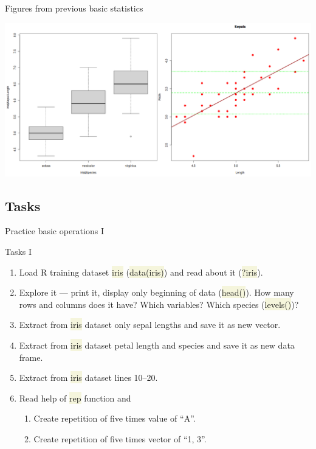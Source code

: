 \documentclass[compress, ucs, xelatex, 11pt, xcolor=svgnames, aspectratio=169,
	hyperref={
		bookmarks=true,
		unicode=true,
		colorlinks=true,
		pdftitle={Molecular data in R},
		plainpages=false,
		pdfauthor={Vojtech Zeisek},
		pdfsubject={Course about phylogeny and evolution in R},
		pdfcreator={XeLaTeX},
		pdfkeywords={R, evolution, phylogeny, molecular data},
		linkcolor=Crimson, %
		anchorcolor=Magenta, %
		citecolor=Magenta, %
		filecolor=Magenta, %
		menucolor=Magenta, %
		urlcolor=DodgerBlue, %
		pdftex},
	url={hyphens, lowtilde} %
	]{beamer}
\renewcommand{\texttt}[1]{\colorbox{Beige}{{\ttfamily #1}}}
\begin{document}
\begin{frame}{Figures from previous basic statistics}
	\begin{center}
		\includegraphics[width=\textwidth-2cm]{iris.png}
	\end{center}
\end{frame}

\subsection{Tasks}

\begin{frame}{Practice basic operations I}
	\begin{exampleblock}{Tasks I}
		\begin{enumerate}
			\item Load R training dataset \texttt{iris} (\texttt{data(iris)}) and read about it (\texttt{?iris}).
			\item Explore it --- print it, display only beginning of data (\texttt{head()}). How many rows and columns does it have? Which variables? Which species (\texttt{levels()})?
			\item Extract from \texttt{iris} dataset only sepal lengths and save it as new vector.
			\item Extract from \texttt{iris} dataset petal length and species and save it as new data frame.
			\item Extract from \texttt{iris} dataset lines 10--20.
			\item Read help of \texttt{rep} function and
			\begin{enumerate}
				\item Create repetition of five times value of \enquote{A}.
				\item Create repetition of five times vector of \enquote{1, 3}.
			\end{enumerate}
		\end{enumerate}
	\end{exampleblock}
\end{frame}
\end{document}
